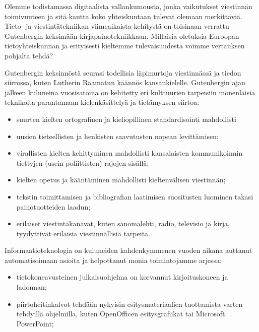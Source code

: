 \begin{multicols}{2}

Olemme todistamassa digitaalista vallankumousta, jonka vaikutukset 
viestinnän toimivuuteen ja sitä kautta koko yhteiskuntaan tulevat olemaan merkittäviä. 
Tieto- ja viestintätekniikan viimeaikaista kehitystä on toisinaan verrattu Gutenbergin keksimään
kirjapainotekniikkaan. Millaisia oletuksia Euroopan tietoyhteiskunnan ja erityisesti kieltemme
tulevaisuudesta voimme vertauksen pohjalta tehdä?


Gutenbergin keksinnöstä seurasi todellisia läpimurtoja viestinnässä ja tiedon
siirrossa, kuten Lutherin Raamatun käännös kansankielelle. Gutenbergin
ajan jälkeen kuluneina vuosisatoina on kehitetty eri kulttuurien tarpeisiin monenlaisia
teknikoita parantamaan kielenkäsittelyä ja tietämyksen siirtoa:
\begin{itemize}
\item suurten kielten ortografinen ja kieliopillinen standardisointi mahdollisti
\item uusien tieteellisten ja henkisten saavutusten nopean levittämisen;

\item virallisten kielten kehittyminen mahdollisti kansalaisten kommunikoinnin
tiettyjen (usein poliittisten) rajojen sisällä;

\item kielten opetus ja kääntäminen mahdollisti kieltenvälisen viestinnän;

\item tekstin toimittamisen ja bibliografian laatimisen suositusten luominen takasi
painotuotteiden laadun;

\item erilaiset viestintäkanavat, kuten sanomalehti, radio, televisio ja kirja, tyydyttivät erilaisia viestinnällisiä tarpeita.
\end{itemize}
Informaatioteknologia on kuluneiden kahdenkymmenen vuoden aikana auttanut
automatisoimaan asioita ja helpottanut monia toimintojamme arjessa:
\begin{itemize}
\item tietokoneavusteinen julkaisuohjelma on korvannut kirjoituskoneen ja ladonnan;

\item piirtoheitinkalvot tehdään nykyisin esitysmateriaalien
tuottamista varten tehdyillä ohjelmilla, kuten
\foreignlanguage{english}{OpenOfficen} esitysgrafiikat tai Microsoft
PowerPoint;


\end{itemize}
\end{multicols}
